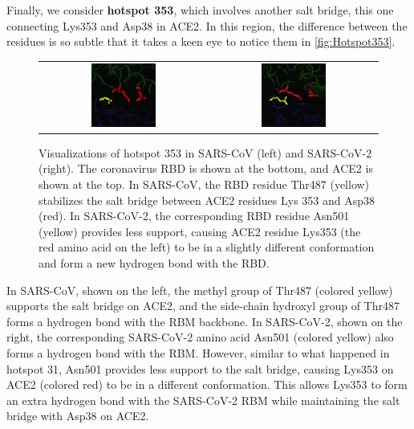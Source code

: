Finally, we consider \textbf{hotspot 353}, which involves another salt bridge, this one connecting Lys353 and Asp38 in ACE2. In this region, the difference between the residues is so subtle that it takes a keen eye to notice them in \autoref{fig:Hotspot353}.\\

\begin{figure}[h]
	\centering
	\mySfFamily
	\begin{tabular}{c c}
	\includegraphics[width = 0.4\textwidth]{../images_CMYK/Hotspot353_SARS} & \includegraphics[width = 0.4\textwidth]{../images_CMYK/Hotspot353_SARS-2}
	\end{tabular}
	\caption{Visualizations of hotspot 353 in SARS-CoV (left) and SARS-CoV-2 (right). The coronavirus RBD is shown at the bottom, and ACE2 is shown at the top. In SARS-CoV, the RBD residue Thr487 (yellow) stabilizes the salt bridge between ACE2 residues Lys 353 and Asp38 (red). In SARS-CoV-2, the corresponding RBD residue Asn501 (yellow) provides less support, causing ACE2 residue Lys353 (the red amino acid on the left) to be in a slightly different conformation and form a new hydrogen bond with the RBD.}
	\label{fig:Hotspot353}
\end{figure}

In SARS-CoV, shown on the left, the methyl group of Thr487 (colored yellow) supports the salt bridge on ACE2, and the side-chain hydroxyl group of Thr487 forms a hydrogen bond with the RBM backbone. In SARS-CoV-2, shown on the right, the corresponding SARS-CoV-2 amino acid Asn501 (colored yellow) also forms a hydrogen bond with the RBM. However, similar to what happened in hotspot 31, Asn501 provides less support to the salt bridge, causing Lys353 on ACE2 (colored red) to be in a different conformation. This allows Lys353 to form an extra hydrogen bond with the SARS-CoV-2 RBM while maintaining the salt bridge with Asp38 on ACE2.

